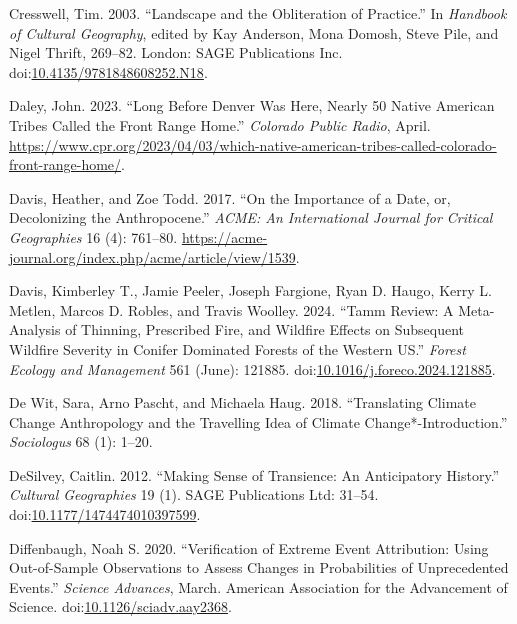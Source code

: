 \documentclass[
]{article}
\newlength{\cslhangindent}
\newenvironment{CSLReferences}[2] %
 {\begin{list}{}{%
  \setlength{\itemindent}{0pt}
  \setlength{\leftmargin}{0pt}
  \setlength{\parsep}{0pt}
  \ifodd #1
   \setlength{\leftmargin}{\cslhangindent}
   \setlength{\itemindent}{-1\cslhangindent}
  \fi
  \setlength{\itemsep}{#2\baselineskip}}}
 {\end{list}}
\begin{document}
\begin{CSLReferences}{1}{0}
Cresswell, Tim. 2003. {``Landscape and the Obliteration of Practice.''} In \emph{Handbook of {Cultural Geography}}, edited by Kay Anderson, Mona Domosh, Steve Pile, and Nigel Thrift, 269--82. London: SAGE Publications Inc. doi:\href{https://doi.org/10.4135/9781848608252.N18}{10.4135/9781848608252.N18}.

Daley, John. 2023. {``Long Before {Denver} Was Here, Nearly 50 {Native American} Tribes Called the {Front Range} Home.''} \emph{Colorado Public Radio}, April. \url{https://www.cpr.org/2023/04/03/which-native-american-tribes-called-colorado-front-range-home/}.

Davis, Heather, and Zoe Todd. 2017. {``On the {Importance} of a {Date}, or, {Decolonizing} the {Anthropocene}.''} \emph{ACME: An International Journal for Critical Geographies} 16 (4): 761--80. \url{https://acme-journal.org/index.php/acme/article/view/1539}.

Davis, Kimberley T., Jamie Peeler, Joseph Fargione, Ryan D. Haugo, Kerry L. Metlen, Marcos D. Robles, and Travis Woolley. 2024. {``Tamm Review: {A} Meta-Analysis of Thinning, Prescribed Fire, and Wildfire Effects on Subsequent Wildfire Severity in Conifer Dominated Forests of the {Western US}.''} \emph{Forest Ecology and Management} 561 (June): 121885. doi:\href{https://doi.org/10.1016/j.foreco.2024.121885}{10.1016/j.foreco.2024.121885}.

De Wit, Sara, Arno Pascht, and Michaela Haug. 2018. {``Translating {Climate Change Anthropology} and the {Travelling Idea} of {Climate Change}*-{Introduction}.''} \emph{Sociologus} 68 (1): 1--20.

DeSilvey, Caitlin. 2012. {``Making Sense of Transience: An Anticipatory History.''} \emph{Cultural Geographies} 19 (1). SAGE Publications Ltd: 31--54. doi:\href{https://doi.org/10.1177/1474474010397599}{10.1177/1474474010397599}.

Diffenbaugh, Noah S. 2020. {``Verification of Extreme Event Attribution: {Using} Out-of-Sample Observations to Assess Changes in Probabilities of Unprecedented Events.''} \emph{Science Advances}, March. American Association for the Advancement of Science. doi:\href{https://doi.org/10.1126/sciadv.aay2368}{10.1126/sciadv.aay2368}.


\end{CSLReferences}
\end{document}
